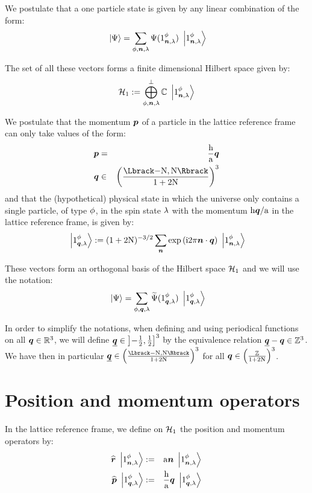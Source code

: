 \documentclass[10pt,a4paper,twoside,openany]{book}
\begin{document}
We postulate that a one particle state is given by any linear combination of the form:
\begin{equation*}
\ket{\Psi} = \sum_{\pt,\n,\sp} \Psi(\bX 1 \pt \n \sp) \ketX 1 \pt \n \sp
\end{equation*}

The set of all these vectors forms a finite dimensional Hilbert space given by:
\begin{equation*}
\Hn 1 \eqdef \bigoplus^\perp_{\pt,\n,\sp} \IC \ketX 1 \pt \n \sp
\end{equation*}

 We postulate that the momentum $\p$ of a particle in the lattice reference frame can only take values of the form:
\begin{eqnarray*}
\p & = & \frac \h \a \q\\
\q & \in & \FLD
\end{eqnarray*}
and that the (hypothetical) physical state in which the universe only contains a single particle, of type $\pt$, in the spin state $\sp$ with the momentum $\h\q / \a$ in the lattice reference frame, is given by:
\begin{equation*}
\ketQ 1 \pt \q \sp \eqdef (1+2 \N)^{-3/2} \sum_{\n} \exp{\i 2 \pi \n \ssp \q} \ketX 1 \pt \n \sp
\end{equation*}

These vectors form an orthogonal basis of the Hilbert space $\Hn 1$ and we will use the notation:
\begin{equation*}
\ket\Psi = \sum_{\pt,\q,\sp} \FT\Psi(\bQ 1 \pt \q \sp) \ketQ 1 \pt \q \sp
\end{equation*}

In order to simplify the notations, when defining and using periodical functions on all $\q \in \IR^3$, we will define $\eqp \q \in \left]-\frac 1 2,\frac 1 2\right]^3$ by the equivalence relation $\eqp \q - \q \in \IZ^3$. We have then in particular $\eqp \q \in \FLD$ for all $\q \in \ILD$.

\section{Position and momentum operators}

 In the lattice reference frame, we define on $\Hn 1$ the position and momentum operators by:
\begin{eqnarray*}
\Rop \ketX 1 \pt \n \sp & \eqdef & \a \n \ketX 1 \pt \n \sp \\
\Pop \ketQ 1 \pt \q \sp & \eqdef & \frac \h \a \q \ketQ 1 \pt \q \sp
\end{eqnarray*}
\end{document}
